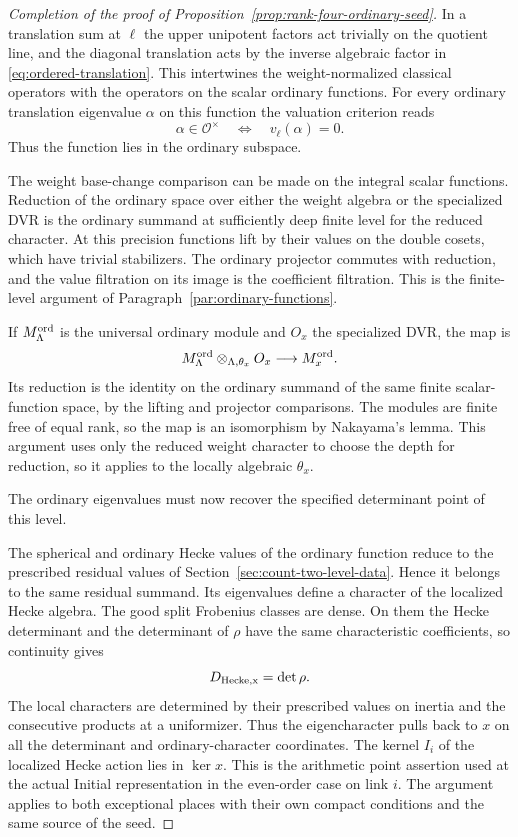 \begin{proof}[Completion of the proof of Proposition~\ref{prop:rank-four-ordinary-seed}]
In a translation sum at \(\ell\) the upper
unipotent factors act trivially on the quotient line, and
the diagonal translation acts by the inverse algebraic
factor in \eqref{eq:ordered-translation}. This intertwines
the weight-normalized classical operators with the
operators on the scalar ordinary functions. For every ordinary translation eigenvalue \(\alpha\) on this function the valuation criterion reads
\[
 \alpha\in\mathcal O^\times\quad\Longleftrightarrow\quad v_\ell(\alpha)=0 .
\]
Thus the function lies in the ordinary subspace.

The weight base-change comparison can be made on the
integral scalar functions. Reduction of the ordinary space
over either the weight algebra or the specialized DVR is
the ordinary summand at sufficiently deep finite level for
the reduced character. At this precision functions lift
by their values on the double cosets, which have trivial
stabilizers. The ordinary projector commutes with reduction,
and the value filtration on its image is the coefficient
filtration. This is the finite-level argument of
Paragraph~\ref{par:ordinary-functions}.

If \(M_\Lambda^{\rm ord}\) is the universal ordinary
module and \(O_x\) the specialized DVR, the map is
\[
 M_\Lambda^{\rm ord}\otimes_{\Lambda,\theta_x} O_x
                          \longrightarrow M_x^{\rm ord}.
\]
Its reduction is the identity on the ordinary summand of
the same finite scalar-function space, by the lifting
and projector comparisons. The modules are finite free
of equal rank, so the map is an isomorphism by Nakayama's
lemma. This argument uses only the reduced
weight character to choose the depth for reduction, so it
applies to the locally algebraic \(\theta_x\).

The ordinary eigenvalues must now recover the specified determinant point of this level.

The spherical and ordinary Hecke values of the ordinary
function reduce to the prescribed residual values of
Section~\ref{sec:count-two-level-data}. Hence it belongs to
the same residual summand. Its eigenvalues define a
character of the localized Hecke algebra. The good split Frobenius classes are dense. On them the Hecke determinant and the determinant of \(\rho\) have the same characteristic coefficients, so continuity gives
\[
 D_{\rm Hecke,x}=\det\rho .
\]
The local characters are determined by their prescribed
values on inertia and the consecutive products at a
uniformizer. Thus the eigencharacter pulls back to \(x\)
on all the determinant and ordinary-character coordinates.
The kernel \(I_i\) of the localized Hecke action lies in
\(\ker x\). This is the arithmetic point assertion used
at the actual Initial representation in the even-order case on link \(i\). The argument
applies to both exceptional places with their own compact
conditions and the same source of the seed.
\end{proof}
